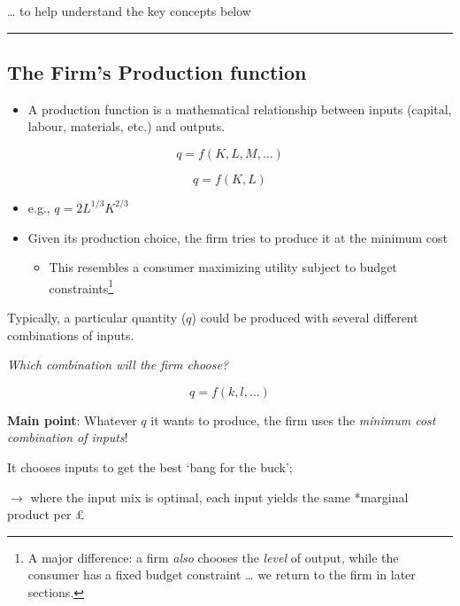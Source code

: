 \documentclass[]{article}
\providecommand{\tightlist}{%
  \setlength{\itemsep}{0pt}\setlength{\parskip}{0pt}}
\begin{document}
\ldots{} to help understand the key concepts below

\begin{center}\rule{0.5\linewidth}{\linethickness}\end{center}

\hypertarget{the-firms-production-function}{%
\subsection{The Firm's Production
function}\label{the-firms-production-function}}

\begin{itemize}
\tightlist
\item
  A production function is a mathematical relationship between inputs
  (capital, labour, materials, etc.) and outputs.
\end{itemize}

\bigskip

\[q = f( K, L, M, ...)\]

\[q = f(K, L)\]

\begin{itemize}
\item
  e.g., \(q =2L^{1/3}K^{2/3}\)
\item
  Given its production choice, the firm tries to produce it at the
  minimum cost

  \begin{itemize}
  \tightlist
  \item
    This resembles a consumer maximizing utility subject to budget
    constraints\footnote{A major difference: a firm \emph{also} chooses
      the \emph{level} of output, while the consumer has a fixed budget
      constraint \ldots{} we return to the firm in later sections.}
  \end{itemize}
\end{itemize}

\bigskip

Typically, a particular quantity (\(q\)) could be produced with several
different combinations of inputs.

\emph{Which combination will the firm choose?}

\[q = f(k,l,...)\]

\textbf{Main point}: Whatever \(q\) it wants to produce, the firm uses
the \emph{minimum cost combination of inputs}!

It chooses inputs to get the best `bang for the buck';

\(\rightarrow\) where the input mix is optimal, each input yields the
same *marginal product per \pounds*
\end{document}
